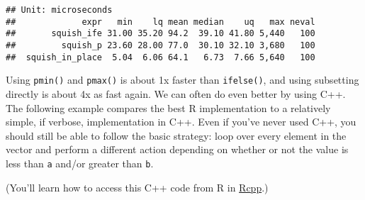 \begin{verbatim}
## Unit: microseconds
##             expr   min    lq mean median    uq   max neval
##       squish_ife 31.00 35.20 94.2  39.10 41.80 5,440   100
##         squish_p 23.60 28.00 77.0  30.10 32.10 3,680   100
##  squish_in_place  5.04  6.06 64.1   6.73  7.66 5,640   100
\end{verbatim}

Using \texttt{pmin()} and \texttt{pmax()} is about 1x faster than
\texttt{ifelse()}, and using subsetting directly is about 4x as fast
again. We can often do even better by using C++. The following example
compares the best R implementation to a relatively simple, if verbose,
implementation in C++. Even if you've never used C++, you should still
be able to follow the basic strategy: loop over every element in the
vector and perform a different action depending on whether or not the
value is less than \texttt{a} and/or greater than \texttt{b}.

\begin{Shaded}
\begin{Highlighting}[]
 


  \NormalTok{ (}
\NormalTok{    \} } 
\NormalTok{    \} }\NormalTok{ \{}
\NormalTok{    \}}
\NormalTok{  \}}

\NormalTok{\}}
\end{Highlighting}
\end{Shaded}

(You'll learn how to access this C++ code from R in
\protect\hyperlink{rcpp}{Rcpp}.)

\begin{Shaded}
\begin{Highlighting}[]
\NormalTok{(}
   \NormalTok{, }\NormalTok{),}
   \NormalTok{, }\NormalTok{),}
   
\NormalTok{)}
\end{Highlighting}
\end{Shaded}

